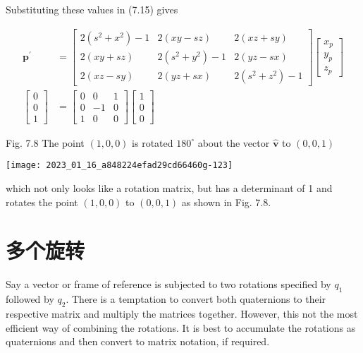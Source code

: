 Substituting these values in (7.15) gives

$$
\begin{aligned}
\mathbf{p}^{\prime} & =\left[\begin{array}{ccc}
2\left(s^{2}+x^{2}\right)-1 & 2(x y-s z) & 2(x z+s y) \\
2(x y+s z) & 2\left(s^{2}+y^{2}\right)-1 & 2(y z-s x) \\
2(x z-s y) & 2(y z+s x) & 2\left(s^{2}+z^{2}\right)-1
\end{array}\right]\left[\begin{array}{l}
x_{p} \\
y_{p} \\
z_{p}
\end{array}\right] \\
{\left[\begin{array}{l}
0 \\
0 \\
1
\end{array}\right] } & =\left[\begin{array}{ccc}
0 & 0 & 1 \\
0 & -1 & 0 \\
1 & 0 & 0
\end{array}\right]\left[\begin{array}{l}
1 \\
0 \\
0
\end{array}\right]
\end{aligned}
$$

Fig. 7.8 The point $(1,0,0)$ is rotated $180^{\circ}$ about the vector $\hat{\mathbf{v}}$ to $(0,0,1)$

\begin{center}
\texttt{[image: 2023\_01\_16\_a848224efad29cd66460g-123]}
\end{center}

which not only looks like a rotation matrix, but has a determinant of 1 and rotates the point $(1,0,0)$ to $(0,0,1)$ as shown in Fig. 7.8.

\section{多个旋转}
Say a vector or frame of reference is subjected to two rotations specified by $q_{1}$ followed by $q_{2}$. There is a temptation to convert both quaternions to their respective matrix and multiply the matrices together. However, this not the most efficient way of combining the rotations. It is best to accumulate the rotations as quaternions and then convert to matrix notation, if required.

